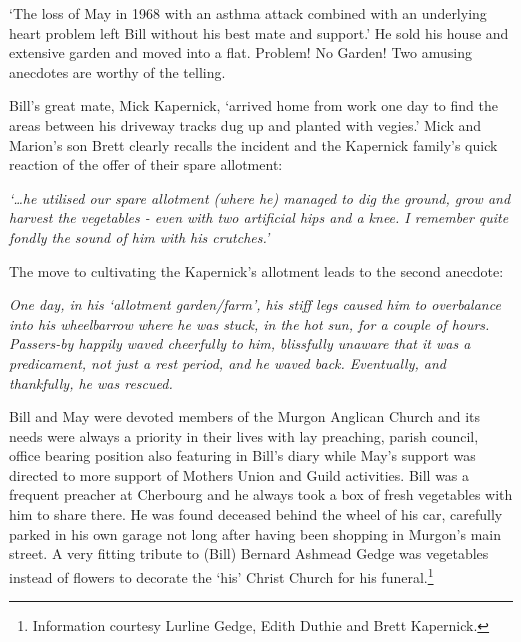 `The loss of May in 1968 with an asthma attack combined with an underlying heart problem left Bill without his best mate and support.' He sold his house and extensive garden and moved into a flat. Problem! No Garden! Two amusing anecdotes are worthy of the telling.



Bill's great mate, Mick Kapernick, `arrived home from work one day to find the areas between his driveway tracks dug up and planted with vegies.' Mick and Marion's son Brett clearly recalls the incident and the Kapernick family's quick reaction of the offer of their spare allotment:



\emph{`\ldots he utilised our spare allotment (where he) managed to dig the ground, grow and harvest the vegetables - even with two artificial hips and a knee. I remember quite fondly the sound of him with his crutches.'}



The move to cultivating the Kapernick's allotment leads to the second anecdote:



\emph{One day, in his `allotment garden/farm', his stiff legs caused him to overbalance into his wheelbarrow where he was stuck, in the hot sun, for a couple of hours. Passers-by happily waved cheerfully to him, blissfully unaware that it was a predicament, not just a rest period, and he waved back. Eventually, and thankfully, he was rescued.}



Bill and May were devoted members of the Murgon Anglican Church and its needs were always a priority in their lives with lay preaching, parish council, office bearing position also featuring in Bill's diary while May's support was directed to more support of Mothers Union and Guild activities. Bill was a frequent preacher at Cherbourg and he always took a box of fresh vegetables with him to share there. He was found deceased behind the wheel of his car, carefully parked in his own garage not long after having been shopping in Murgon's main street. A very fitting tribute to (Bill) Bernard Ashmead Gedge was vegetables instead of flowers to decorate the `his' Christ Church for his funeral.\footnote{Information courtesy Lurline Gedge, Edith Duthie and Brett Kapernick.}








